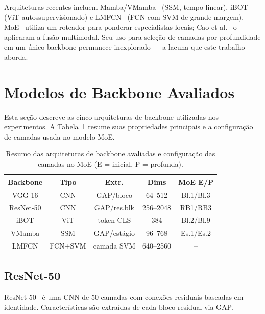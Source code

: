 \documentclass[conference]{IEEEtran}
\begin{document}
Arquiteturas recentes incluem Mamba/VMamba~\cite{b16} (SSM, tempo linear),
iBOT~\cite{b17} (ViT autossupervisionado) e LMFCN~\cite{b28} (FCN com
SVM de grande margem).
MoE~\cite{bmoe_orig} utiliza um roteador para ponderar especialistas
locais; Cao et al.~\cite{bmoe_cao} o aplicaram a fus\~{a}o multimodal.
Seu uso para sele\c{c}\~{a}o de camadas por profundidade em um \'{u}nico
backbone permanece inexplorado --- a lacuna que este trabalho aborda.

\section{Modelos de Backbone Avaliados}

Esta se\c{c}\~{a}o descreve as cinco arquiteturas de backbone utilizadas
nos experimentos. A Tabela~\ref{tab_backbones} resume suas propriedades
principais e a configura\c{c}\~{a}o de camadas usada no modelo MoE.

\begin{table}[htbp]
\caption{Resumo das arquiteturas de backbone avaliadas e configura\c{c}\~{a}o
         das camadas no MoE (E = inicial, P = profunda).}
\begin{center}
\begin{tabular}{c|c|c|c|c}
\hline
\textbf{Backbone} & \textbf{Tipo} & \textbf{Extr.} & \textbf{Dims} & \textbf{MoE E/P} \\
\hline
VGG-16    & CNN   & GAP/bloco  & 64--512   & Bl.1/Bl.3  \\
ResNet-50 & CNN   & GAP/res.blk& 256--2048 & RB1/RB3    \\
iBOT      & ViT   & token CLS  & 384       & Bl.2/Bl.9  \\
VMamba    & SSM   & GAP/est\'{a}gio  & 96--768   & Es.1/Es.2  \\
LMFCN     & FCN+SVM & camada SVM& 640--2560 & --         \\
\hline
\end{tabular}
\label{tab_backbones}
\end{center}
\end{table}

\subsection{ResNet-50}

ResNet-50~\cite{b4} \'{e} uma CNN de 50 camadas com conex\~{o}es
residuais baseadas em identidade.
Caracter\'{i}sticas s\~{a}o extra\'{i}das de cada bloco residual via GAP.
\end{document}
